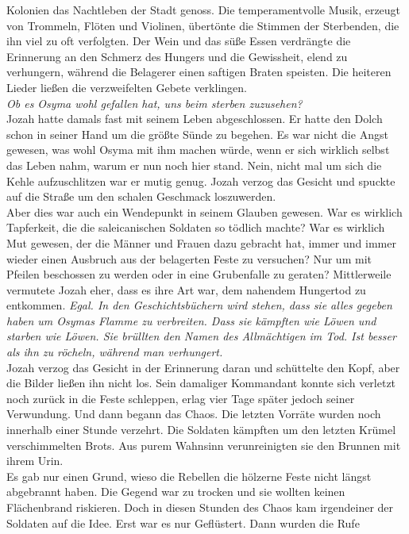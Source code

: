 Kolonien das Nachtleben der Stadt genoss. Die temperamentvolle Musik, erzeugt von Trommeln, Flöten 
und Violinen, übertönte die Stimmen der Sterbenden, die ihn viel zu oft verfolgten. Der Wein und 
das süße Essen verdrängte die Erinnerung an den Schmerz des Hungers und die Gewissheit, elend zu 
verhungern, während die Belagerer einen saftigen Braten speisten. Die heiteren Lieder ließen die 
verzweifelten Gebete verklingen.\\
\textit{Ob es Osyma wohl gefallen hat, uns beim sterben zuzusehen?}\\
Jozah hatte damals fast mit seinem Leben abgeschlossen. Er hatte den Dolch schon in seiner Hand um 
die größte Sünde zu begehen. Es war nicht die Angst gewesen, was wohl Osyma mit ihm machen würde, 
wenn er sich wirklich selbst das Leben nahm, warum er nun noch hier stand. Nein, nicht mal um sich 
die Kehle aufzuschlitzen war er mutig genug. Jozah verzog das Gesicht und spuckte auf die Straße um 
den schalen Geschmack loszuwerden.\\
Aber dies war auch ein Wendepunkt in seinem Glauben gewesen. War es wirklich Tapferkeit, die die 
saleicanischen Soldaten so tödlich machte? War es wirklich Mut gewesen, der die Männer und Frauen 
dazu gebracht hat, immer und immer wieder einen Ausbruch aus der belagerten Feste zu versuchen? Nur 
um mit Pfeilen beschossen zu werden oder in eine Grubenfalle zu geraten? Mittlerweile vermutete 
Jozah eher, dass es ihre Art war, dem nahendem Hungertod zu entkommen. \textit{Egal. In den 
Geschichtsbüchern wird stehen, dass sie alles gegeben haben um Osymas Flamme zu verbreiten. Dass 
sie kämpften wie Löwen und starben wie Löwen. Sie brüllten den Namen des Allmächtigen im Tod. Ist 
besser als ihn zu röcheln, während man verhungert.}\\
Jozah verzog das Gesicht in der Erinnerung daran und schüttelte den Kopf, aber die Bilder ließen 
ihn nicht los. Sein damaliger Kommandant konnte sich verletzt noch zurück in die Feste schleppen, 
erlag vier Tage später jedoch seiner Verwundung. Und dann begann das Chaos. Die letzten Vorräte 
wurden noch innerhalb einer Stunde verzehrt. Die Soldaten kämpften um den letzten Krümel 
verschimmelten Brots. Aus purem Wahnsinn verunreinigten sie den Brunnen mit ihrem Urin.\\
Es gab nur einen Grund, wieso die Rebellen die hölzerne Feste nicht längst abgebrannt haben. Die 
Gegend war zu trocken und sie wollten keinen Flächenbrand riskieren. Doch in diesen Stunden des 
Chaos kam irgendeiner der Soldaten auf die Idee. Erst war es nur Geflüstert. Dann wurden die Rufe 
